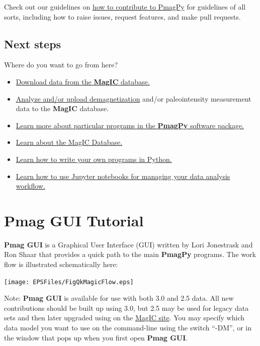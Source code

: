 \documentclass[11pt]{book}
\begin{document}
{Check out our guidelines on \href{https://github.com/PmagPy/PmagPy/blob/master/CONTRIBUTING.md}{how to contribute to PmagPy} for guidelines of all sorts, including how to raise issues, request features, and make pull requests.



\section{Next steps}

Where do you want to go from here?

\begin{itemize}
\item \href{#magic_download}{Download data from the {\bf MagIC} database.}
\item \href{#pmag_gui.py}{Analyze and/or upload demagnetization} and/or paleointensity measurement data to the {\bf MagIC} database.
\item \href{#PmagPy}{Learn more about particular programs in the {\bf PmagPy} software package.}
\item \href{#MagICDatabase}{Learn about the MagIC Database.}
\item \href{#Python}{Learn how to write your own programs in Python.}
\item \href{#Notebooks}{Learn how to use Jupyter notebooks for managing your data analysis workflow.}
\end{itemize}



\chapter{Pmag GUI Tutorial}
\label{chap:Pmag GUI}

{\bf Pmag GUI} is a Graphical User Interface (GUI) written by Lori Jonestrask and Ron Shaar  that provides a quick path to the main {\bf PmagPy} programs. The work flow is illustrated schematically here:

\texttt{[image: EPSFiles/FigQkMagicFlow.eps]}

Note: {\bf Pmag GUI} is available for use with both 3.0 and 2.5 data.  All new contributions should be built up using 3.0, but 2.5 may be used for legacy data sets and then later upgraded using on the \href{https://beta.earthref.org/MagIC/upgrade}{MagIC site}.  You may specify which data model you want to use on the command-line using the switch ``-DM'', or in the window that pops up when you first open {\bf Pmag GUI}.

}
\end{document}
